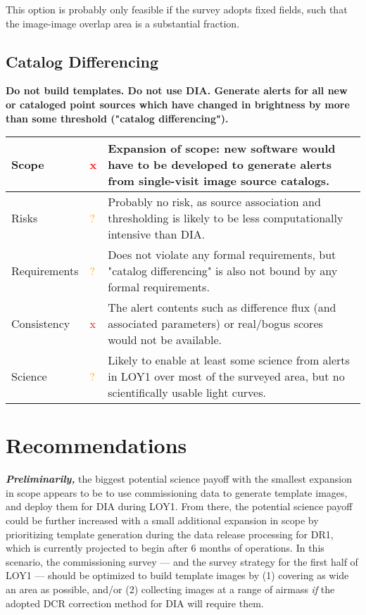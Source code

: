 \documentclass[DM,lsstdraft,toc]{lsstdoc}
\begin{document}
This option is probably only feasible if the survey adopts fixed fields, such that the image-image overlap area is a substantial fraction.


\subsection{Catalog Differencing}

{\bf Do not build templates. Do not use DIA. Generate alerts for all new or cataloged point sources which have changed in brightness by more than some threshold ("catalog differencing").}

\begin{center}
\begin{tabular}{|p{2.5cm}|p{0.3cm}|p{13cm}|}
\hline
Scope & \textcolor{red}{x} & Expansion of scope: new software would have to be developed to generate alerts from single-visit image source catalogs. \\
\hline
Risks & \textcolor{orange}{?} & Probably no risk, as source association and thresholding is likely to be less computationally intensive than DIA. \\
\hline
Requirements & \textcolor{orange}{?} & Does not violate any formal requirements, but "catalog differencing" is also not bound by any formal requirements. \\
\hline
Consistency & \textcolor{red}{x} & The alert contents such as difference flux (and associated parameters) or real/bogus scores would not be available. \\
\hline
Science & \textcolor{orange}{?} & Likely to enable at least some science from alerts in LOY1 over most of the surveyed area, but no scientifically usable light curves. \\
\hline
\end{tabular}
\end{center}



\section{Recommendations}\label{sec:rec}

{\bf {\em Preliminarily,}} the biggest potential science payoff with the smallest expansion in scope appears to be to use commissioning data to generate template images, and deploy them for DIA during LOY1. From there, the potential science payoff could be further increased with a small additional expansion in scope by prioritizing template generation during the data release processing for DR1, which is currently projected to begin after 6 months of operations. In this scenario, the commissioning survey --- and the survey strategy for the first half of LOY1 --- should be optimized to build template images by (1) covering as wide an area as possible, and/or (2) collecting images at a range of airmass {\em if} the adopted DCR correction method for DIA will require them.







\end{document}
